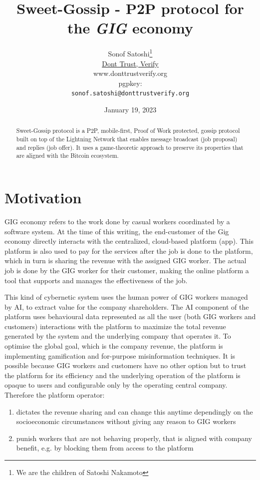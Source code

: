 \documentclass{article}
\title{Sweet-Gossip - P2P protocol for the \emph{GIG} economy}
\date{January 19, 2023}
\author{
	{Sonof Satoshi}\thanks{We are the children of Satoshi Nakamoto} \\
	\href{www.donttrustverify.org}{Dont Trust, Verify}\\
	www.donttrustverify.org \\
	pgpkey:\\
	\texttt{sonof.satoshi@donttrustverify.org}\\
}
\begin{document}
\maketitle

\begin{abstract}
Sweet-Gossip protocol is a P2P, mobile-first, Proof of Work protected, gossip protocol built on top of the Lightning Network that enables message broadcast (job proposal) and replies (job offer). It uses a game-theoretic approach to preserve its properties that are aligned with the Bitcoin ecosystem.
\end{abstract}




\section{Motivation}

GIG economy refers to the work done by casual workers coordinated by a software system. At the time of this writing, the end-customer of the Gig economy directly interacts with the centralized, cloud-based platform (app). This platform is also used to pay for the services after the job is done to the platform, which in turn is sharing the revenue with the assigned GIG worker. The actual job is done by the GIG worker for their customer, making the online platform a tool that supports and manages the effectiveness of the job.

This kind of cybernetic system uses the human power of GIG workers managed by AI, to extract value for the company shareholders. The AI component of the platform uses behavioural data represented as all the user (both GIG workers and customers) interactions with the platform to maximize the total revenue generated by the system and the underlying company that operates it. To optimise the global goal, which is the company revenue, the platform is implementing gamification and for-purpose misinformation techniques. It is possible because GIG workers and customers have no other option but to trust the platform for its efficiency and the underlying operation of the platform is opaque to users and configurable only by the operating central company. Therefore the platform operator:

\begin{enumerate}
\item dictates the revenue sharing and can change this anytime dependingly on the socioeconomic circumstances without giving any reason to GIG workers

\item punish workers that are not behaving properly, that is aligned with company benefit, e.g. by blocking them from access to the platform
\end{enumerate}
\end{document}
